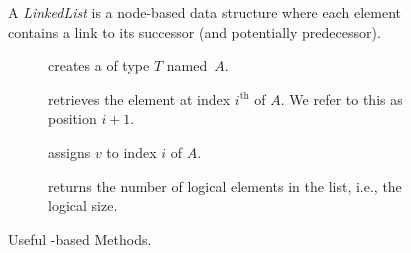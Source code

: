 \begin{figure}[tp]
  \small
  \begin{tcolorbox}[title=Java Linked Lists]
    A \emph{LinkedList} is a node-based data structure where each element contains a link to its successor (and potentially predecessor).
    \vspace{2ex}
  \begin{description}
    \item [] creates a  of type $T$ named~$A$.
    \item [] retrieves the element at index $i^{\text{th}}$ of $A$. We refer to this as position $i + 1$. 
    \item [] assigns $v$ to index $i$ of $A$.
    \item [] returns the number of logical elements in the list, i.e., the logical size.
  \end{description}
\end{tcolorbox}
  \caption{Useful -based Methods.}
  \label{fig:linkedlists}
\end{figure}


